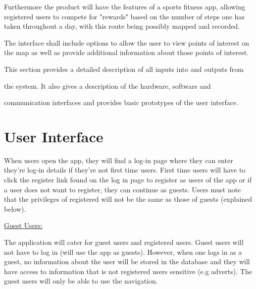 \documentclass[11pt]{article}
\begin{document}
	

Furthermore the product will have the features of a sports fitness app, allowing registered users to compete for "rewards" based on the number of steps one has taken throughout a day, with this route being possibly mapped and recorded.

The interface shall include options to allow the user to view points of interest on the map as well as provide additional information about those points of interest.










This section provides a detailed description of all inputs into and outputs from

the system. It also gives a description of the hardware, software and

communication interfaces and provides basic prototypes of the user interface.



\section{User Interface}



{\raggedright

When users open the app, they will find a log-in page where they can enter they're log-in details if they're not first time users. First time users will have to click the register link found on the log in page to register as users of the app or if a user does not want to register, they can continue as guests. Users must note that the privileges of registered will not be the same as those of guests (explained below). 

}



{\raggedright

\uline{Guest Users:}}



{\raggedright

The application will cater for guest users and registered users. Guest users will not have to log in (will use the app as guests). However, when one logs in as a guest, no information about the user will be stored in the database and they will have access to information that is not registered users sensitive (e.g adverts). The guest users will only be able to use the navigation.

}
\end{document}
